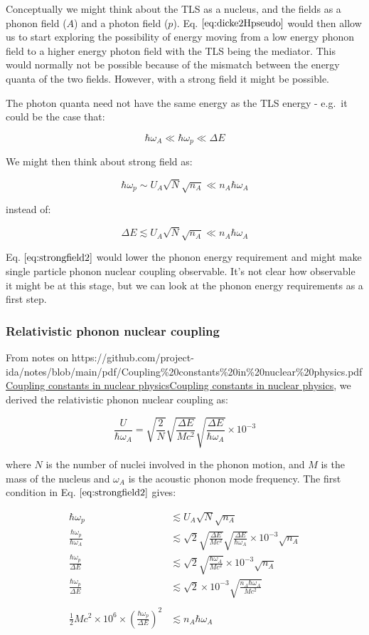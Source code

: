 \documentclass[
]{article}
\let\oldhref\href
\renewcommand{\href}[2]{\ifx#1\urlprefix\oldhref{#1}{#2}\else\uline{\oldhref{#1}{#2}}\fi}
\renewcommand{\[}{\begin{equation}}
\renewcommand{\]}{\end{equation}}
\begin{document}
Conceptually we might think about the TLS as a nucleus, and the fields
as a phonon field (\(A\)) and a photon field (\(p\)). Eq.
\(\ref{eq:dicke2Hpseudo}\) would then allow us to start exploring the
possibility of energy moving from a low energy phonon field to a higher
energy photon field with the TLS being the mediator. This would normally
not be possible because of the mismatch between the energy quanta of the
two fields. However, with a strong field it might be possible.

The photon quanta need not have the same energy as the TLS energy -
e.g.~it could be the case that:

\[
\hbar\omega_A\ll \hbar\omega_p \ll \Delta E
\]

We might then think about strong field as:

\[
\hbar \omega_p \sim U_A\sqrt{N}\sqrt{n_A}\ll n_A\hbar \omega_A
\label{eq:strongfield2}
\]

instead of:

\[
\Delta E \lesssim U_A\sqrt{N}\sqrt{n_A} \ll n_A\hbar \omega_A
\]

Eq. \(\ref{eq:strongfield2}\) would lower the phonon energy requirement
and might make single particle phonon nuclear coupling observable. It's
not clear how observable it might be at this stage, but we can look at
the phonon energy requirements as a first step.

\subsubsection{Relativistic phonon nuclear
coupling}\label{relativistic-phonon-nuclear-coupling-1}

From notes on
\href{https://github.com/project-ida/notes/blob/main/pdf/Coupling\%20constants\%20in\%20nuclear\%20physics.pdf}{Coupling
constants in nuclear physics}, we derived the relativistic phonon
nuclear coupling as:

\[
\frac{U}{\hbar \omega_A} = \sqrt{\frac{2}{N}} \sqrt{\frac{\Delta E}{M c^2}} \sqrt{\frac{\Delta E}{\hbar \omega_A}} \times 10^{-3}
\label{eq:phononcoupling2}
\]

where \(N\) is the number of nuclei involved in the phonon motion, and
\(M\) is the mass of the nucleus and \(\omega_A\) is the acoustic phonon
mode frequency. The first condition in Eq. \(\ref{eq:strongfield2}\)
gives:

\[
\begin{aligned}
\hbar\omega_p &\lesssim U_A\sqrt{N}\sqrt{n_A} \\
\frac{\hbar\omega_p}{\hbar \omega_A} &\lesssim \sqrt{2} \sqrt{\frac{\Delta E}{M c^2}} \sqrt{\frac{\Delta E}{\hbar \omega_A}} \times 10^{-3}\sqrt{n_A} \\
\frac{\hbar\omega_p}{\Delta E} &\lesssim \sqrt{2} \sqrt{\frac{\hbar\omega_A}{M c^2}} \times 10^{-3}\sqrt{n_A} \\
\frac{\hbar\omega_p}{\Delta E} &\lesssim \sqrt{2}\times 10^{-3}\sqrt{\frac{n_A\hbar\omega_A}{ Mc^2}}\\
\\ \frac{1}{2}Mc^2 \times 10^6 \times \left(\frac{\hbar\omega_p}{\Delta E}\right)^2 &\lesssim n_A\hbar\omega_A
\end{aligned}
\label{eq:strongfieldconditiononn2}
\]
\end{document}
